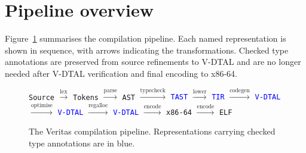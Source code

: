 
%
%
%
%
%
%


\section{Pipeline overview}

Figure~\ref{fig:pipeline} summarises the compilation pipeline. Each named representation is shown in sequence, with arrows indicating the transformations. Checked type annotations are preserved from source refinements to V-DTAL and are no longer needed after V-DTAL verification and final encoding to x86-64.

\begin{figure}[h]
  \centering
  \begin{tcolorbox}[colback=white, colframe=black, width=\textwidth, boxrule=0.5pt]
    \begin{center}
      \texttt{Source} $\xrightarrow{\text{lex}}$ \texttt{Tokens} $\xrightarrow{\text{parse}}$ \texttt{AST} $\xrightarrow{\text{typecheck}}$ \texttt{\textcolor{blue}{TAST}} $\xrightarrow{\text{lower}}$ \texttt{\textcolor{blue}{TIR}} $\xrightarrow{\text{codegen}}$ \texttt{\textcolor{blue}{V-DTAL}} $\xrightarrow{\text{optimise}}$ \texttt{\textcolor{blue}{V-DTAL}} $\xrightarrow{\text{regalloc}}$ \texttt{\textcolor{blue}{V-DTAL}} $\xrightarrow{\text{encode}}$ \texttt{x86-64} $\xrightarrow{\text{encode}}$ \texttt{ELF}
    \end{center}
  \end{tcolorbox}
  \caption{The Veritas compilation pipeline. Representations carrying checked type annotations are in blue.}
  \label{fig:pipeline}
\end{figure}
%

